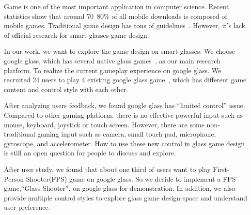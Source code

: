 \documentclass{sigchi}
\begin{document}
Game is one of the most important application in computer science. Recent statistics show that around 70~80\% of all mobile downloads is composed of mobile games\cite{statistics,infographic}. Traditional game design has tons of guidelines~\cite{videogame,mobilegame,bodygame,gameflow,argame,wearable}. However, it's lack of official research for smart glasses game design.

In our work, we want to explore the game design on smart glasses. We choose google glass, which has  several native glass games~\cite{minigame}, as our main research platform. To realize the current gameplay experience on google glass. We recruited 24 users to play 4 existing google glass game~\cite{minigame}, which has different game content and control style with each other. 

After analyzing users feedback, we found google glass has ``limited control'' issue. Compared to other gaming platform, there is no effective powerful input such as mouse, keyboard, joystick or touch screen. However, there are some non-traditional gaming input such as camera, small touch pad, microphone, gyroscope, and accelerometer. How to use these new control in glass game design is still an open question for people to discuss and explore. 

After user study, we found that about one third of users want to play First-Person Shooter(FPS) game on google glass. So we decide to implement a FPS game,``Glass Shooter'', on google glass for demonstration. In addition, we also provide multiple control styles to explore glass game design space and understand user preference.


\end{document}
